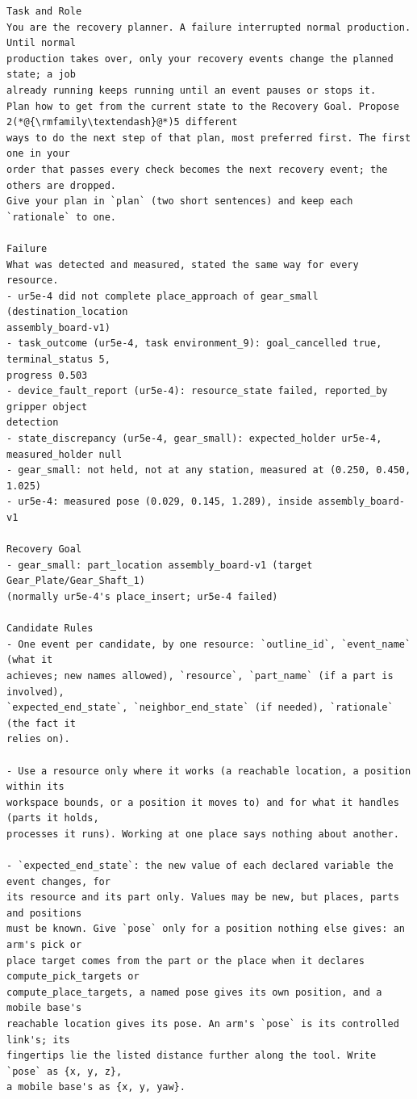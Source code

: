 \documentclass[preprint,12pt,authoryear]{elsarticle}
\newcommand{\recordheading}[1]{\par\Needspace{5\baselineskip}\medskip{\small\bfseries #1}\par\nopagebreak}
\begin{document}
\recordheading{User message \enspace{\normalfont\itshape Part slippage, outline turn 1}}
\begin{lstlisting}[style=recorded]
Task and Role
You are the recovery planner. A failure interrupted normal production. Until normal
production takes over, only your recovery events change the planned state; a job
already running keeps running until an event pauses or stops it.
Plan how to get from the current state to the Recovery Goal. Propose 2(*@{\rmfamily\textendash}@*)5 different
ways to do the next step of that plan, most preferred first. The first one in your
order that passes every check becomes the next recovery event; the others are dropped.
Give your plan in `plan` (two short sentences) and keep each `rationale` to one.

Failure
What was detected and measured, stated the same way for every resource.
- ur5e-4 did not complete place_approach of gear_small (destination_location
assembly_board-v1)
- task_outcome (ur5e-4, task environment_9): goal_cancelled true, terminal_status 5,
progress 0.503
- device_fault_report (ur5e-4): resource_state failed, reported_by gripper object
detection
- state_discrepancy (ur5e-4, gear_small): expected_holder ur5e-4, measured_holder null
- gear_small: not held, not at any station, measured at (0.250, 0.450, 1.025)
- ur5e-4: measured pose (0.029, 0.145, 1.289), inside assembly_board-v1

Recovery Goal
- gear_small: part_location assembly_board-v1 (target Gear_Plate/Gear_Shaft_1)
(normally ur5e-4's place_insert; ur5e-4 failed)

Candidate Rules
- One event per candidate, by one resource: `outline_id`, `event_name` (what it
achieves; new names allowed), `resource`, `part_name` (if a part is involved),
`expected_end_state`, `neighbor_end_state` (if needed), `rationale` (the fact it
relies on).

- Use a resource only where it works (a reachable location, a position within its
workspace bounds, or a position it moves to) and for what it handles (parts it holds,
processes it runs). Working at one place says nothing about another.

- `expected_end_state`: the new value of each declared variable the event changes, for
its resource and its part only. Values may be new, but places, parts and positions
must be known. Give `pose` only for a position nothing else gives: an arm's pick or
place target comes from the part or the place when it declares compute_pick_targets or
compute_place_targets, a named pose gives its own position, and a mobile base's
reachable location gives its pose. An arm's `pose` is its controlled link's; its
fingertips lie the listed distance further along the tool. Write `pose` as {x, y, z},
a mobile base's as {x, y, yaw}.


\end{lstlisting}
\end{document}
